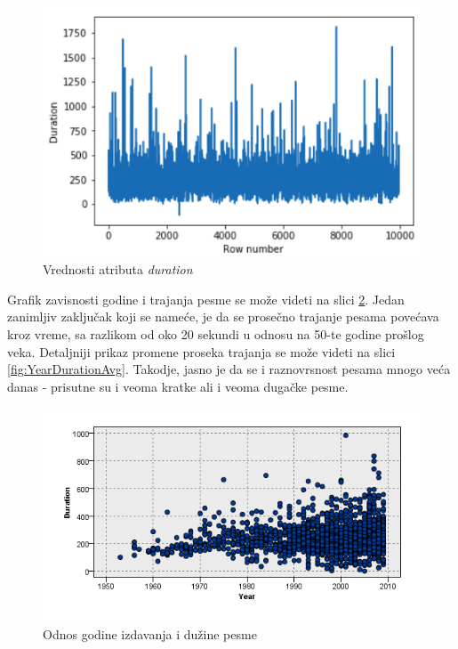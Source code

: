 \begin{figure}[H]
    \includegraphics[scale=0.6]{resources/duration.png}
    \caption{Vrednosti atributa \emph{duration}}
    \label{fig:duration}
\end{figure}

Grafik zavisnosti godine i trajanja pesme se mo\v{z}e videti na slici \ref{fig:YearDuration}. Jedan zanimljiv zaklju\v{c}ak koji se name\'c{}e, je da se prose\v{c}no trajanje pesama pove\'c{}ava kroz vreme, sa razlikom od oko 20 sekundi u odnosu na 50-te godine pro\v{s}log veka. Detaljniji prikaz promene proseka trajanja se mo\v{z}e videti na slici \ref{fig:YearDurationAvg}. Takodje, jasno je da se i raznovrsnost pesama mnogo ve\'c{}a danas - prisutne su i veoma kratke ali i veoma duga\v{c}ke pesme.


\begin{figure}[H]
    \centering
    \includegraphics[scale=0.52]{resources/year-duration.png}
    \caption{Odnos godine izdavanja i du\v{z}ine pesme}
    \label{fig:YearDuration}
\end{figure}

